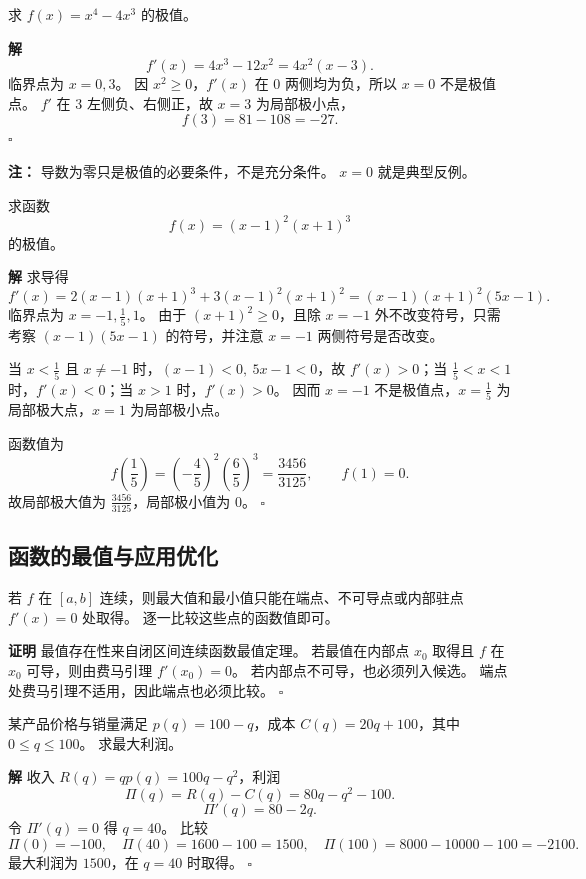 \documentclass[fontset=fandol]{ctexart}
\newenvironment{proofdetail}{\par\noindent\textbf{证明}\quad}{\hfill$\square$\par\vspace{0.8em}}
\newenvironment{solution}{\par\noindent\textbf{解}\quad}{\hfill$\square$\par\vspace{0.8em}}
\newenvironment{warning}{\par\noindent\textbf{注：}\quad}{\par\vspace{0.8em}}
\begin{document}
\begin{example}[极值]
求 $f(x)=x^4-4x^3$ 的极值。
\end{example}
\begin{solution}
\[
f'(x)=4x^3-12x^2=4x^2(x-3).
\]
临界点为 $x=0,3$。 因 $x^2\geq0$，$f'(x)$ 在 $0$ 两侧均为负，所以 $x=0$ 不是极值点。 $f'$ 在 $3$ 左侧负、右侧正，故 $x=3$ 为局部极小点，
\[
f(3)=81-108=-27.
\]
\end{solution}
\begin{warning}
导数为零只是极值的必要条件，不是充分条件。 $x=0$ 就是典型反例。
\end{warning}

\begin{example}[极值]
求函数
\[
f(x)=(x-1)^2(x+1)^3
\]
的极值。
\end{example}
\begin{solution}
求导得
\[
f'(x)=2(x-1)(x+1)^3+3(x-1)^2(x+1)^2
=(x-1)(x+1)^2(5x-1).
\]
临界点为 $x=-1,\frac15,1$。 由于 $(x+1)^2\geq0$，且除 $x=-1$ 外不改变符号，只需考察 $(x-1)(5x-1)$ 的符号，并注意 $x=-1$ 两侧符号是否改变。

当 $x<\frac15$ 且 $x\neq-1$ 时，$(x-1)<0,\ 5x-1<0$，故 $f'(x)>0$；当 $\frac15<x<1$ 时，$f'(x)<0$；当 $x>1$ 时，$f'(x)>0$。 因而 $x=-1$ 不是极值点，$x=\frac15$ 为局部极大点，$x=1$ 为局部极小点。

函数值为
\[
f\left(\frac15\right)=\left(-\frac45\right)^2\left(\frac65\right)^3=\frac{3456}{3125},\qquad
f(1)=0.
\]
故局部极大值为 $\frac{3456}{3125}$，局部极小值为 $0$。
\end{solution}

\subsection{函数的最值与应用优化}

\begin{proposition}[闭区间最值求法]
若 $f$ 在 $[a,b]$ 连续，则最大值和最小值只能在端点、不可导点或内部驻点 $f'(x)=0$ 处取得。 逐一比较这些点的函数值即可。
\end{proposition}
\begin{proofdetail}
最值存在性来自闭区间连续函数最值定理。 若最值在内部点 $x_0$ 取得且 $f$ 在 $x_0$ 可导，则由费马引理 $f'(x_0)=0$。 若内部点不可导，也必须列入候选。 端点处费马引理不适用，因此端点也必须比较。
\end{proofdetail}

\begin{example}[利润最大化]
某产品价格与销量满足 $p(q)=100-q$，成本 $C(q)=20q+100$，其中 $0\leq q\leq100$。 求最大利润。
\end{example}
\begin{solution}
收入 $R(q)=qp(q)=100q-q^2$，利润
\[
\Pi(q)=R(q)-C(q)=80q-q^2-100.
\]
\[
\Pi'(q)=80-2q.
\]
令 $\Pi'(q)=0$ 得 $q=40$。 比较
\[
\Pi(0)=-100,\quad \Pi(40)=1600-100=1500,\quad \Pi(100)=8000-10000-100=-2100.
\]
最大利润为 $1500$，在 $q=40$ 时取得。
\end{solution}
\end{document}
